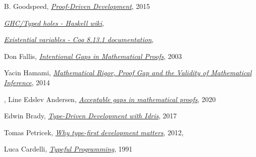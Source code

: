 \documentclass[declaration,mgr,english,shortabstract]{iithesis}
\begin{document}
\begin{thebibliography}{1}
    B. Goodspeed,
    \href{https://arxiv.org/pdf/1512.02102.pdf}{\textit{Proof-Driven Development}}, 2015

    \href{https://wiki.haskell.org/GHC/Typed_holes}{\textit{GHC/Typed holes - Haskell wiki}}, \\

    \href{https://coq.inria.fr/refman/language/extensions/evars.html}{\textit{Existential variables - Coq 8.13.1 documentation}}, \\

    Don Fallis,
    \href{https://www.jstor.org/stable/20117325?seq=1}{\textit{Intentional Gaps in Mathematical Proofs}}, 2003

    Yacin Hamami,
    \href{https://journals.openedition.org/philosophiascientiae/908}{\textit{Mathematical Rigor, Proof Gap and the Validity of Mathematical Inference}}, 2014

,
    Line Edslev Andersen,
    \href{https://link.springer.com/article/10.1007/s11229-018-1778-8}{\textit{Acceptable gaps in mathematical proofs}}, 2020

    Edwin Brady,
    \href{https://www.manning.com/books/type-driven-development-with-idris}{\textit{Type-Driven Development with Idris}},
    2017

    Tomas Petricek,
    \href{http://tomasp.net/blog/type-first-development.aspx/}{\textit{Why type-first development matters}}, 2012, \\

    Luca Cardelli,
    \href{http://www.lucacardelli.name/Papers/TypefulProg.pdf}{\textit{Typeful Programming}}, 1991

\end{thebibliography}
\end{document}
